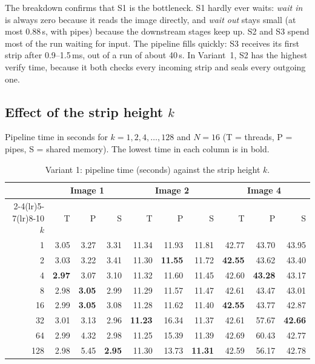 \documentclass[11pt,a4paper]{article}
\newcommand{\cfgRing}{16}
\begin{document}
The breakdown confirms that S1 is the bottleneck. S1 hardly ever waits: \emph{wait in} is
always zero because it reads the image directly, and \emph{wait out} stays small (at most 0.88\,s,
with pipes) because the downstream stages keep up. S2 and S3 spend most of the run waiting for
input. The pipeline fills quickly: S3 receives its first strip after 0.9--1.5\,ms, out of a run
of about 40\,s. In Variant~1, S2 has the highest verify time, because it both checks every incoming strip
and seals every outgoing one.

\subsection{Effect of the strip height \texorpdfstring{$k$}{k}}
Pipeline time in seconds for $k=1,2,4,\dots,128$ and $N=\cfgRing$ (T = threads, P = pipes,
S = shared memory). The lowest time in each column is in bold.

\begin{table}[htbp]
\centering
\caption{Variant 1: pipeline time (seconds) against the strip height $k$.}
\label{tab:k-v1}
\begin{tabular}{r rrr rrr rrr}
\toprule
& \multicolumn{3}{c}{Image 1} & \multicolumn{3}{c}{Image 2} & \multicolumn{3}{c}{Image 4} \\
\cmidrule(lr){2-4}\cmidrule(lr){5-7}\cmidrule(lr){8-10}
$k$ & T & P & S & T & P & S & T & P & S \\
\midrule
1 & 3.05 & 3.27 & 3.31 & 11.34 & 11.93 & 11.81 & 42.77 & 43.70 & 43.95 \\
2 & 3.03 & 3.22 & 3.41 & 11.30 & \textbf{11.55} & 11.72 & \textbf{42.55} & 43.62 & 43.40 \\
4 & \textbf{2.97} & 3.07 & 3.10 & 11.32 & 11.60 & 11.45 & 42.60 & \textbf{43.28} & 43.17 \\
8 & 2.98 & \textbf{3.05} & 2.99 & 11.29 & 11.57 & 11.47 & 42.61 & 43.47 & 43.01 \\
16 & 2.99 & \textbf{3.05} & 3.08 & 11.28 & 11.62 & 11.40 & \textbf{42.55} & 43.77 & 42.87 \\
32 & 3.01 & 3.13 & 2.96 & \textbf{11.23} & 16.34 & 11.37 & 42.61 & 57.67 & \textbf{42.66} \\
64 & 2.99 & 4.32 & 2.98 & 11.25 & 15.39 & 11.39 & 42.69 & 60.43 & 42.77 \\
128 & 2.98 & 5.45 & \textbf{2.95} & 11.30 & 13.73 & \textbf{11.31} & 42.59 & 56.17 & 42.78 \\
\bottomrule
\end{tabular}
\end{table}
\end{document}
